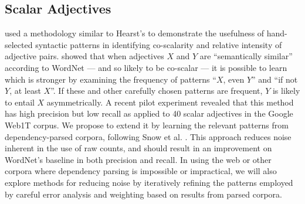 \documentclass[10pt]{article}
\begin{document}
 
\vspace{-.1in}
\subsection{\label{scalar}Scalar Adjectives}

\vspace {-3mm}

\cite{sheinmanetal2013,sheinman2009adjscales} used a methodology similar to Hearst's \cite{hearst1992automatic} to demonstrate the usefulness of  hand-selected syntactic patterns in identifying co-scalarity and relative intensity of adjective pairs. 
\cite{sheinmanetal2013} showed that when adjectives $X$ and $Y$ are ``semantically similar'' according to WordNet --- and so likely to be co-scalar --- it is possible to learn which is stronger by examining the frequency of patterns ``$X$, even $Y$'' and ``if not $Y$, at least $X$''. If these and other carefully chosen patterns are frequent, $Y$ is likely to entail $X$ asymmetrically. A recent pilot experiment revealed that this method has high precision but low recall as applied to 40 scalar adjectives in the Google Web1T corpus. We propose to extend it by learning the relevant patterns from dependency-parsed corpora, following Snow et al. \cite{snow04,snow2006semantic}. This approach reduces noise inherent in the use of raw counts, and should result in an improvement on WordNet's baseline in both precision and recall. In using the web or other corpora where dependency parsing is impossible or impractical, we will also explore methods for reducing noise by iteratively refining the patterns employed by careful error analysis and weighting based on results from parsed corpora.
\end{document}
